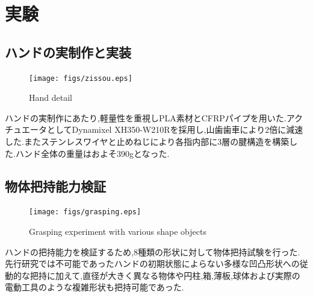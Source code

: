 \documentclass{jarticle}
\begin{document}
\section{実験}
\subsection{ハンドの実制作と実装}
\vspace{-4mm}
\begin{figure}[H]
  \centering
  \texttt{[image: figs/zissou.eps]}
  \caption{Hand detail}
  \vspace{-4mm}
  \label{fig:zissou}
\end{figure}
ハンドの実制作にあたり,軽量性を重視しPLA素材とCFRPパイプを用いた.アクチュエータとしてDynamixel XH350-W210Rを採用し,山歯歯車により2倍に減速した.またステンレスワイヤと止めねじにより各指内部に3層の腱構造を構築した.ハンド全体の重量はおよそ390gとなった.
\subsection{物体把持能力検証}
\vspace{-4mm}
\begin{figure}[h]
  \centering
  \texttt{[image: figs/grasping.eps]}
  \caption{Grasping experiment with various shape objects}
  \vspace{-2mm}
  \label{fig:haji}
\end{figure}
ハンドの把持能力を検証するため,8種類の形状に対して物体把持試験を行った.先行研究では不可能であったハンドの初期状態によらない多様な凹凸形状への従動的な把持に加えて,直径が大きく異なる物体や円柱,箱,薄板,球体および実際の電動工具のような複雑形状も把持可能であった.
\end{document}
